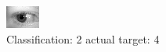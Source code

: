 \begin{figure}[h!]
\begin{center}
\includegraphics[width=0.60\columnwidth]{figures/ID794_class_2_target_4.png}
\end{center}
\caption{ Classification: 2 actual target: 4}
\label{fig:ID794_class_2_target_4}
\end{figure}

